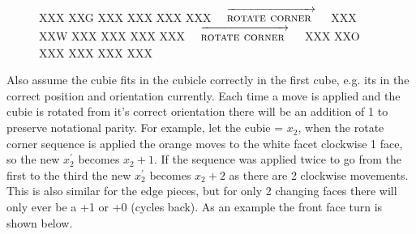 \documentclass{article}
\begin{document}
\newcommand{\rotatecorner}{[rotatecorner],F2,F2}%
\newcommand{\rotatecornerarr}{$\quad\overrightarrow{\strut\textsc{rotate corner }}\quad$}
\begin{figure}[hbt]
\centering
  \RubikCubeSolved%
   {X}{X}{X} {X}{X}{G}%
   {X}{X}{X} {X}{X}{X}%
   {X}{X}{X} {X}{X}{X}%
  \rotatecornerarr
  \RubikRotation{\rotatecorner}
   {X}{X}{X} {X}{X}{W}%
   {X}{X}{X} {X}{X}{X}%
   {X}{X}{X} {X}{X}{X}%
  \rotatecornerarr
   {X}{X}{X} {X}{X}{O}%
   {X}{X}{X} {X}{X}{X}%
   {X}{X}{X} {X}{X}{X}%
\end{figure}
\vspace{20pt}
Also assume the cubie fits in the cubicle correctly in the first cube, e.g. its in the correct position and orientation currently. Each time a move is applied and the cubie is rotated from it's correct orientation there will be an addition of 1 to preserve notational parity. For example, let the cubie = $x_2$, when the rotate corner sequence is applied the orange moves to the white facet clockwise 1 face, so the new $x_2^{'}$ becomes $x_2 + 1$. If the sequence was applied twice to go from the first to the third the new $x_2^{'}$ becomes $x_2 + 2$ as there are 2 clockwise movements. This is also similar for the edge pieces, but for only 2 changing faces there will only ever be a +1 or +0 (cycles back).
As an example the front face turn is shown below.

\end{document}
